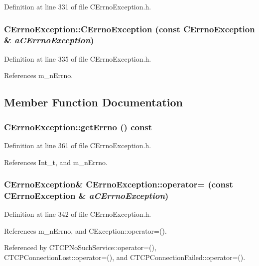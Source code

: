 Definition at line 331 of file CErrno\-Exception.h.
\subsubsection{\setlength{\rightskip}{0pt plus 5cm}CErrno\-Exception::CErrno\-Exception (const CErrno\-Exception \& {\em a\-CErrno\-Exception})\hspace{0.3cm}{\tt  [inline]}}\label{classCErrnoException_a3}




Definition at line 335 of file CErrno\-Exception.h.

References m\_\-n\-Errno.

\subsection{Member Function Documentation}
\subsubsection{ CErrno\-Exception::get\-Errno () const\hspace{0.3cm}{\tt  [inline]}}\label{classCErrnoException_a6}




Definition at line 361 of file CErrno\-Exception.h.

References Int\_\-t, and m\_\-n\-Errno.
\subsubsection{\setlength{\rightskip}{0pt plus 5cm}CErrno\-Exception\& CErrno\-Exception::operator= (const CErrno\-Exception \& {\em a\-CErrno\-Exception})\hspace{0.3cm}{\tt  [inline]}}\label{classCErrnoException_a4}




Definition at line 342 of file CErrno\-Exception.h.

References m\_\-n\-Errno, and CException::operator=().

Referenced by CTCPNo\-Such\-Service::operator=(), CTCPConnection\-Lost::operator=(), and CTCPConnection\-Failed::operator=().
